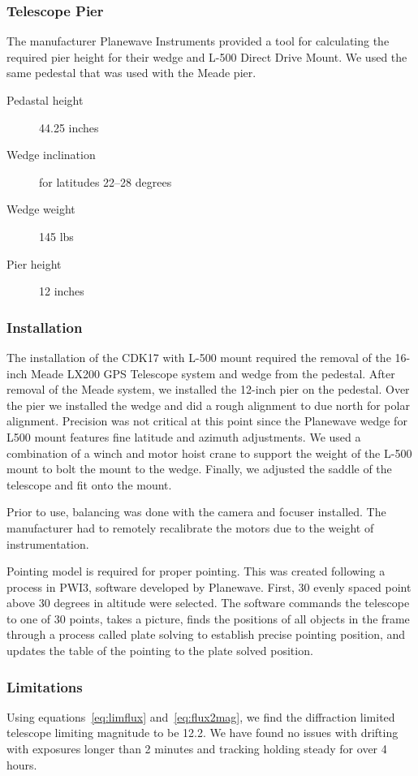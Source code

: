 \subsubsection{Telescope Pier}
The manufacturer Planewave Instruments provided a tool for calculating the required pier height for their wedge and L-500 Direct Drive Mount.
We used the same pedestal that was used with the Meade pier.
\begin{description}
    \item[Pedastal height] 44.25 inches
    \item[Wedge inclination] for latitudes 22--28 degrees
    \item[Wedge weight] 145 lbs
    \item[Pier height] 12 inches
\end{description}

\subsubsection{Installation}
The installation of the CDK17 with L-500 mount required the removal of the 16-inch Meade LX200 GPS Telescope system and wedge from the pedestal.
After removal of the Meade system, we installed the 12-inch pier on the pedestal.
Over the pier we installed the wedge and did a rough alignment to due north for polar alignment.
Precision was not critical at this point since the Planewave wedge for L500 mount features fine latitude and azimuth adjustments.
We used a combination of a winch and motor hoist crane to support the weight of the L-500 mount to bolt the mount to the wedge.
Finally, we adjusted the saddle of the telescope and fit onto the mount.

Prior to use, balancing was done with the camera and focuser installed.
The manufacturer had to remotely recalibrate the motors due to the weight of instrumentation.

Pointing model is required for proper pointing. This was created following a process in PWI3, software developed by Planewave.
First, 30 evenly spaced point above 30 degrees in altitude were selected. 
The software commands the telescope to one of 30 points, takes a picture,
finds the positions of all objects in the frame through a process called plate solving to establish precise pointing position, and
updates the table of the pointing to the plate solved position.

\subsubsection{Limitations}
Using equations~\ref{eq:limflux} and~\ref{eq:flux2mag}, we find the diffraction limited telescope limiting magnitude to be 12.2.
We have found no issues with drifting with exposures longer than 2 minutes and tracking holding steady for over 4 hours.

